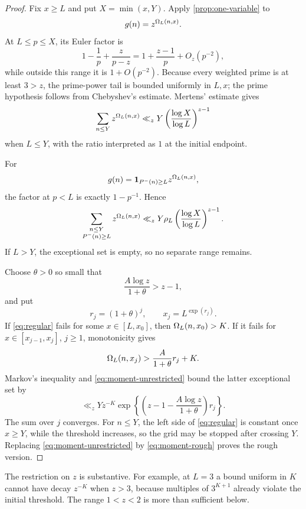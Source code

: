 \documentclass[11pt]{article}
\begin{document}
\begin{proof}
Fix \(x\geq L\) and put \(X=\min(x,Y)\). Apply
\cref{prop:one-variable} to
\[
 g(n)=z^{\Omega_L(n,x)}.
\]
At \(L\leq p\leq X\), its Euler factor is
\[
 1-\frac1p+\frac{z}{p-z}
 =1+\frac{z-1}{p}+O_z(p^{-2}),
\]
while outside this range it is \(1+O(p^{-2})\). Because every weighted
prime is at least \(3>z\), the prime-power tail is bounded uniformly in
\(L,x\); the prime hypothesis follows from Chebyshev's estimate. Mertens'
estimate gives
\begin{equation}\label{eq:moment-unrestricted}
 \sum_{n\leq Y}z^{\Omega_L(n,x)}
 \ll_z
 Y\left(\frac{\log X}{\log L}\right)^{z-1}
\end{equation}
when \(L\leq Y\), with the ratio interpreted as \(1\) at the initial
endpoint.

For
\[
 g(n)=\mathbf 1_{P^-(n)\geq L}z^{\Omega_L(n,x)},
\]
the factor at \(p<L\) is exactly \(1-p^{-1}\). Hence
\begin{equation}\label{eq:moment-rough}
 \sum_{\substack{n\leq Y\\P^-(n)\geq L}}
 z^{\Omega_L(n,x)}
 \ll_z
 Y\rho_L
 \left(\frac{\log X}{\log L}\right)^{z-1}.
\end{equation}
If \(L>Y\), the exceptional set is empty, so no separate range remains.

Choose \(\theta>0\) so small that
\[
 \frac{A\log z}{1+\theta}>z-1,
\]
and put
\[
 r_j=(1+\theta)^j,\qquad x_j=L^{\exp(r_j)}.
\]
If \eqref{eq:regular} fails for some \(x\in[L,x_0]\), then
\(\Omega_L(n,x_0)>K\). If it fails for
\(x\in[x_{j-1},x_j]\), \(j\geq1\), monotonicity gives
\[
 \Omega_L(n,x_j)>
 \frac{A}{1+\theta}r_j+K.
\]
Markov's inequality and \eqref{eq:moment-unrestricted} bound the latter
exceptional set by
\[
 \ll_z Yz^{-K}
 \exp\left\{
 \left(z-1-\frac{A\log z}{1+\theta}\right)r_j
 \right\}.
\]
The sum over \(j\) converges. For \(n\leq Y\), the left side of
\eqref{eq:regular} is constant once \(x\geq Y\), while the threshold
increases, so the grid may be stopped after crossing \(Y\). Replacing
\eqref{eq:moment-unrestricted} by \eqref{eq:moment-rough} proves the rough
version.
\end{proof}

\begin{remark}
The restriction on \(z\) is substantive. For example, at \(L=3\) a bound
uniform in \(K\) cannot have decay \(z^{-K}\) when \(z>3\), because multiples
of \(3^{K+1}\) already violate the initial threshold. The range \(1<z<2\)
is more than sufficient below.
\end{remark}
\end{document}

